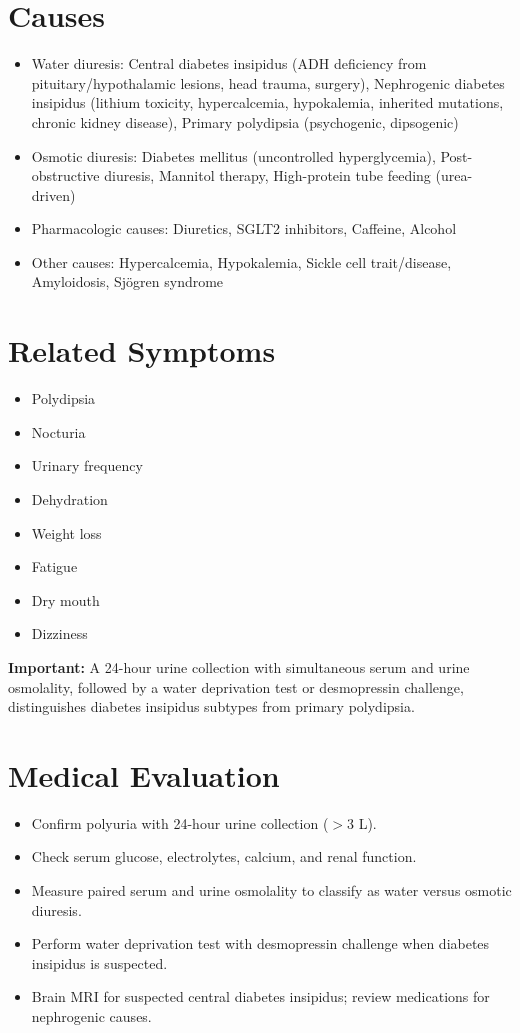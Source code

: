 \section*{Causes}
\begin{itemize}
  \item Water diuresis: Central diabetes insipidus (ADH deficiency from pituitary/hypothalamic lesions, head trauma, surgery), Nephrogenic diabetes insipidus (lithium toxicity, hypercalcemia, hypokalemia, inherited mutations, chronic kidney disease), Primary polydipsia (psychogenic, dipsogenic)
  \item Osmotic diuresis: Diabetes mellitus (uncontrolled hyperglycemia), Post-obstructive diuresis, Mannitol therapy, High-protein tube feeding (urea-driven)
  \item Pharmacologic causes: Diuretics, SGLT2 inhibitors, Caffeine, Alcohol
  \item Other causes: Hypercalcemia, Hypokalemia, Sickle cell trait/disease, Amyloidosis, Sj\"ogren syndrome
\end{itemize}

\section*{Related Symptoms}
\begin{itemize}
  \item Polydipsia
  \item Nocturia
  \item Urinary frequency
  \item Dehydration
  \item Weight loss
  \item Fatigue
  \item Dry mouth
  \item Dizziness
\end{itemize}
\textbf{Important:} A 24-hour urine collection with simultaneous serum and urine osmolality, followed by a water deprivation test or desmopressin challenge, distinguishes diabetes insipidus subtypes from primary polydipsia.

\section*{Medical Evaluation}
\begin{itemize}
  \item Confirm polyuria with 24-hour urine collection ($>$3 L).
  \item Check serum glucose, electrolytes, calcium, and renal function.
  \item Measure paired serum and urine osmolality to classify as water versus osmotic diuresis.
  \item Perform water deprivation test with desmopressin challenge when diabetes insipidus is suspected.
  \item Brain MRI for suspected central diabetes insipidus; review medications for nephrogenic causes.
\end{itemize}

